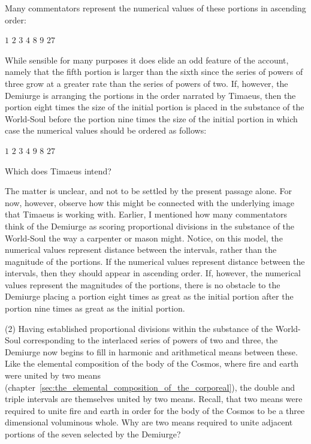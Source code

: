 Many commentators represent the numerical values of these portions in ascending order:
\begin{center}
	\( 1 \) \( 2 \) \( 3 \) \( 4 \) \( 8 \) \( 9 \) \( 27 \)
\end{center}
While sensible for many purposes it does elide an odd feature of the account, namely that the fifth portion is larger than the sixth since the series of powers of three grow at a greater rate than the series of powers of two. If, however, the Demiurge is arranging the portions in the order narrated by Timaeus, then the portion eight times the size of the initial portion is placed in the substance of the World-Soul before the portion nine times the size of the initial portion in which case the numerical values should be ordered as follows:
\begin{center}
	\( 1 \) \( 2 \) \( 3 \) \( 4 \) \( 9 \) \( 8 \) \( 27 \)
\end{center}
Which does Timaeus intend?

The matter is unclear, and not to be settled by the present passage alone. For now, however, observe how this might be connected with the underlying image that Timaeus is working with. Earlier, I mentioned how many commentators think of the Demiurge as scoring proportional divisions in the substance of the World-Soul the way a carpenter or mason might. Notice, on this model, the numerical values represent distance between the intervals, rather than the magnitude of the portions. If the numerical values represent distance between the intervals, then they should appear in ascending order. If, however, the numerical values represent the magnitudes of the portions, there is no obstacle to the Demiurge placing a portion eight times as great as the initial portion after the portion nine times as great as the initial portion. 

(2) Having established proportional divisions within the substance of the World-Soul corresponding to the interlaced series of powers of two and three, the Demiurge now begins to fill in harmonic and arithmetical means between these. Like the elemental composition of the body of the Cosmos, where fire and earth were united by two means (chapter~\ref{sec:the_elemental_composition_of_the_corporeal}), the double and triple intervals are themselves united by two means. Recall, that two means were required to unite fire and earth in order for the body of the Cosmos to be a three dimensional voluminous whole. Why are two means required to unite adjacent portions of the seven selected by the Demiurge?

